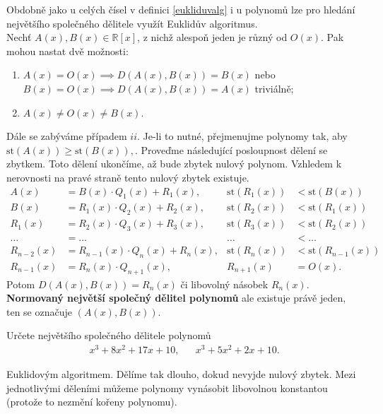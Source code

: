 \begin{pozn}
  Obdobně jako u celých čísel v definici \ref{eukliduvalg} i u polynomů lze pro hledání největšího společného dělitele využít Euklidův algoritmus.\\
  Nechť $A(x), B(x) \in \mathbb R [x]$, z nichž alespoň jeden je různý od $O(x)$. Pak mohou nastat dvě možnosti:
  \begin{enumerate}[$i.$]
    \item $A(x) = O(x) \implies D(A(x), B(x)) = B(x)$ nebo $B(x) = O(x) \implies D(A(x), B(x)) = A(x)$ triviálně;
    \item $A(x)\ne O(x)\ne B(x)$.
  \end{enumerate}
  Dále se zabýváme případem $ii$. Je-li to nutné, přejmenujme polynomy tak, aby $\text{st}(A(x)) \geq \text{st}(B(x)),$.
  Proveďme následující posloupnost dělení se zbytkem. Toto dělení ukončíme, až bude zbytek nulový polynom.
  Vzhledem k nerovnosti na pravé straně tento nulový zbytek existuje.
  \begin{align*}
    A(x) & = B(x) \cdot Q_1(x) + R_1(x),  & \text{st}(R_1(x)) & < \text{st}(B(x)) \\
    B(x) & = R_1(x) \cdot Q_2(x) + R_2(x), & \text{st}(R_2(x)) & < \text{st}(R_1(x)) \\
    R_1(x) & = R_2(x) \cdot Q_3(x) + R_3(x), & \text{st}(R_3(x)) & < \text{st}(R_2(x))\\
    \dots & = \dots & \dots & < \dots\\
    R_{n-2}(x) & = R_{n-1}(x) \cdot Q_n(x) + R_n(x), & \text{st}(R_n(x)) & < \text{st}(R_{n-1}(x)) \\
    R_{n-1}(x) & = R_{n}(x) \cdot Q_{n+1}(x), & R_{n+1}(x) & = O(x).
  \end{align*}
  Potom $D(A(x), B(x)) = R_n(x)$ či libovolný násobek $R_n(x)$. \textbf{Normovaný největší společný dělitel polynomů}
  ale existuje právě jeden, ten se označuje $(A(x), B(x))$.
\end{pozn}

\begin{priklad}
    Určete největšího společného dělitele polynomů
    \begin{align*}
        x^3+8x^2+17x+10,& &   x^3+5x^2+2x+10.
    \end{align*}
\end{priklad}

\begin{reseni}
Euklidovým algoritmem. Dělíme tak dlouho, dokud nevyjde nulový zbytek.
Mezi jednotlivými děleními můžeme polynomy vynásobit libovolnou konstantou (protože
to nezmění kořeny polynomu).
\end{reseni}

